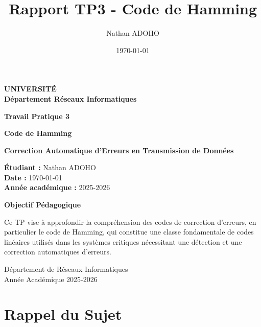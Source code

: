 \documentclass[12pt, a4paper]{article}
\title{Rapport TP3 - Code de Hamming}
\author{Nathan ADOHO}
\date{\today}
\begin{document}
\begin{titlepage}
\centering
\vspace*{2cm}

\Large
\textbf{UNIVERSITÉ}\\
\textbf{Département Réseaux Informatiques}

\vspace{3cm}

\huge
\textbf{Travail Pratique 3}

\vspace{0.5cm}

\LARGE
\textbf{Code de Hamming}

\vspace{3cm}

\Large
\textbf{Correction Automatique d'Erreurs en Transmission de Données}

\vspace{4cm}

\large
\textbf{Étudiant :} Nathan ADOHO\\
\vspace{0.3cm}
\textbf{Date :} \today\\
\vspace{0.3cm}
\textbf{Année académique :} 2025-2026

\vspace{4cm}

\begin{center}
\parbox{0.8\textwidth}{
\centering
\textbf{Objectif Pédagogique}\par
\vspace{0.5cm}
Ce TP vise à approfondir la compréhension des codes de correction d'erreurs, en particulier le code de Hamming, qui constitue une classe fondamentale de codes linéaires utilisés dans les systèmes critiques nécessitant une détection et une correction automatiques d'erreurs.
}
\end{center}

\vfill

\footnotesize
Département de Réseaux Informatiques\\
Année Académique 2025-2026
\end{titlepage}

\maketitle

\tableofcontents
\newpage

\section{Rappel du Sujet}
\end{document}
